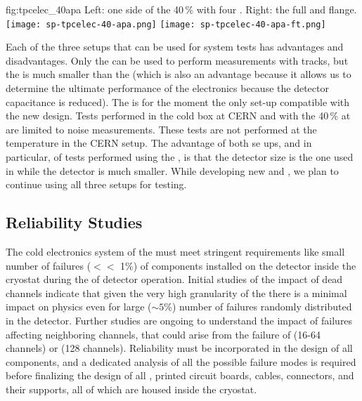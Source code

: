 \begin{dunefigure}
{fig:tpcelec_40apa}
{Left: one side of the \num{40}\,\%  with four .  Right: the full  \fdth and flange.}
\texttt{[image: sp-tpcelec-40-apa.png]}
\hspace{3mm}
\texttt{[image: sp-tpcelec-40-apa-ft.png]}
\end{dunefigure}

Each of the three setups that can be used for system tests has advantages
and disadvantages. Only the   can be used to 
perform measurements with tracks, but the  is 
much smaller than the    (which is also an advantage because it
allows us to determine the ultimate performance of the electronics because
the detector capacitance is reduced). The  
is for the moment the only set-up compatible with the new 
design. Tests performed in the cold box at CERN and with the \num{40}\,\%  
at  are limited to noise measurements. These tests are not
performed at the  temperature in the CERN setup. The advantage of
both se ups, and in particular, of tests performed using the 
, is that the detector size is the one used in  while the  detector is
much smaller. While developing
new  and , we plan to continue using all
three setups for testing.

\subsection{Reliability Studies}
\label{sec:fdsp-tpcelec-qa-reliability}


The  cold electronics system of the    must meet 
stringent requirements like small number of failures ($<<$ 1\%) of components installed 
on the detector inside the cryostat during the \dunelifetime of 
detector operation. Initial studies of the impact of dead channels indicate
that given the very high granularity of the  there is a minimal
impact on physics even for large ($\sim5$\%) number of failures randomly distributed
in the detector. Further studies are ongoing to understand the impact of failures 
affecting neighboring channels, that could arise from the failure of  
(16-64 channels) or  (128 channels). Reliability must be incorporated in the 
design of all components, and a dedicated analysis of all the possible failure modes is required 
before finalizing the design of all , printed circuit boards, cables, 
connectors, and their supports, all of which are housed inside the   
cryostat. 

